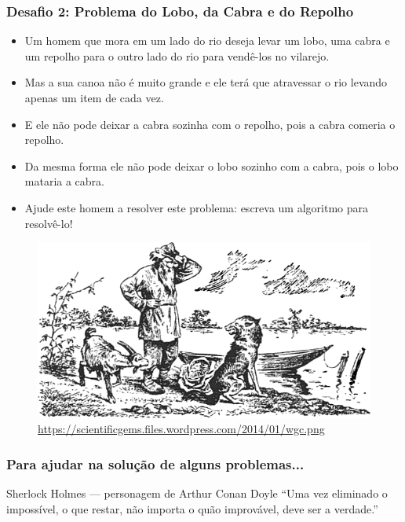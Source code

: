 \documentclass[aspectratio=169]{beamer}
\begin{document}
\begin{frame}\frametitle{Desafio 2: Problema do Lobo, da Cabra e do Repolho}
\scriptsize{
\begin{itemize}
	\item Um homem que mora em um lado do rio deseja levar um lobo, uma cabra e um repolho para o outro lado do rio para vendê-los no vilarejo.
	\item Mas a sua canoa não é muito grande e ele terá que atravessar o rio levando apenas um item de cada vez.
	\item E ele não pode deixar a cabra sozinha com o repolho, pois a cabra comeria o repolho.
	\item Da mesma forma ele não pode deixar o lobo sozinho com a cabra, pois o lobo mataria a cabra.
	\item Ajude este homem a resolver este problema: escreva um algoritmo para resolvê-lo!
\end{itemize}
}
\begin{figure}[h]
	\centering
	\includegraphics[height=0.3\paperheight]{pucrs-ep-fprog-unidade_01-introducao-laminas-lobo_cabra_repolho.png}\\
	\tiny{\url{https://scientificgems.files.wordpress.com/2014/01/wgc.png}}
\end{figure}
\end{frame}

\begin{frame}\frametitle{Para ajudar na solução de alguns problemas...}
	\begin{block}{Sherlock Holmes --- personagem de Arthur Conan Doyle}
		``Uma vez eliminado o impossível, o que restar, não importa o quão improvável, deve ser a verdade.''
	\end{block}
\end{frame}
\end{document}
